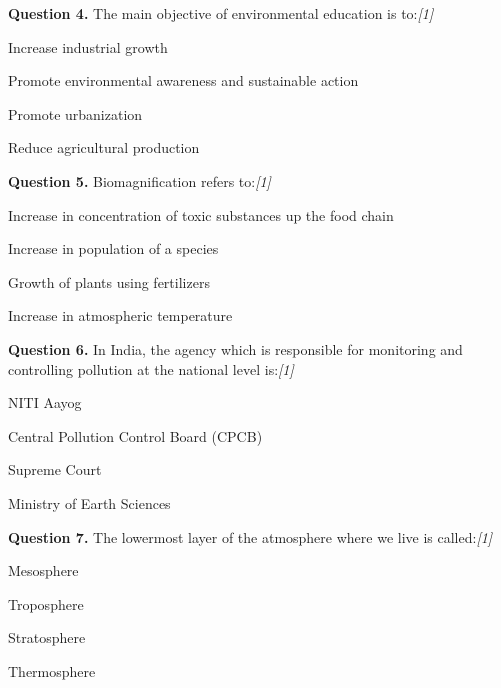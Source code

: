 \documentclass[11pt,a4paper]{article}
\newcommand{\pts}[1]{\hfill   \textit{[#1]}}
\begin{document}
\medskip


\noindent   \textbf{Question 4.} The main objective of environmental education is to:\pts{1}

\begin{parts}
  \item Increase industrial growth
  \item Promote environmental awareness and sustainable action
  \item Promote urbanization
  \item Reduce agricultural production
\end{parts}

\medskip


\noindent   \textbf{Question 5.} Biomagnification refers to:\pts{1}

\begin{parts}
  \item Increase in concentration of toxic substances up the food chain
  \item Increase in population of a species
  \item Growth of plants using fertilizers
  \item Increase in atmospheric temperature
\end{parts}

\medskip


\noindent   \textbf{Question 6.} In India, the agency which is responsible for monitoring and controlling pollution at the national level is:\pts{1}

\begin{parts}
  \item NITI Aayog
  \item Central Pollution Control Board (CPCB)
  \item Supreme Court
  \item Ministry of Earth Sciences
\end{parts}

\medskip


\noindent   \textbf{Question 7.} The lowermost layer of the atmosphere where we live is called:\pts{1}

\begin{parts}
  \item Mesosphere
  \item Troposphere
  \item Stratosphere
  \item Thermosphere
\end{parts}

\medskip
\end{document}
